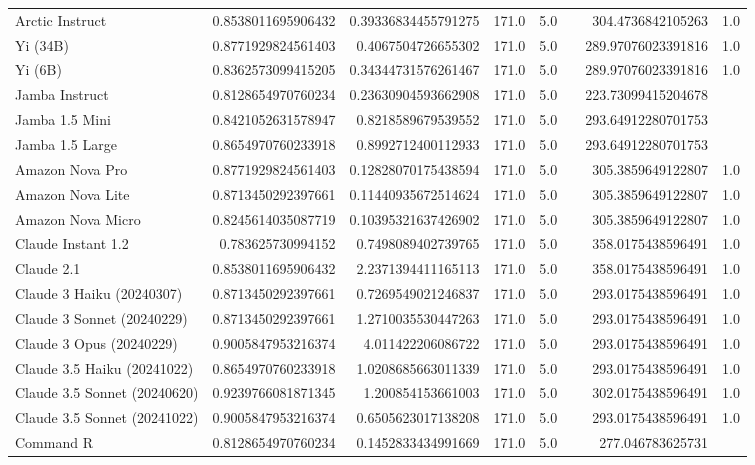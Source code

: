 \begin{table}[htp]
{\begin{tabular}{lrrrrrrr}
Arctic Instruct & 0.8538011695906432 & 0.39336834455791275 & 171.0 & 5.0 &  & 304.4736842105263 & 1.0 \\
Yi (34B) & 0.8771929824561403 & 0.4067504726655302 & 171.0 & 5.0 &  & 289.97076023391816 & 1.0 \\
Yi (6B) & 0.8362573099415205 & 0.34344731576261467 & 171.0 & 5.0 &  & 289.97076023391816 & 1.0 \\
Jamba Instruct & 0.8128654970760234 & 0.23630904593662908 & 171.0 & 5.0 &  & 223.73099415204678 &  \\
Jamba 1.5 Mini & 0.8421052631578947 & 0.8218589679539552 & 171.0 & 5.0 &  & 293.64912280701753 &  \\
Jamba 1.5 Large & 0.8654970760233918 & 0.8992712400112933 & 171.0 & 5.0 &  & 293.64912280701753 &  \\
Amazon Nova Pro & 0.8771929824561403 & 0.12828070175438594 & 171.0 & 5.0 &  & 305.3859649122807 & 1.0 \\
Amazon Nova Lite & 0.8713450292397661 & 0.11440935672514624 & 171.0 & 5.0 &  & 305.3859649122807 & 1.0 \\
Amazon Nova Micro & 0.8245614035087719 & 0.10395321637426902 & 171.0 & 5.0 &  & 305.3859649122807 & 1.0 \\
Claude Instant 1.2 & 0.783625730994152 & 0.7498089402739765 & 171.0 & 5.0 &  & 358.0175438596491 & 1.0 \\
Claude 2.1 & 0.8538011695906432 & 2.2371394411165113 & 171.0 & 5.0 &  & 358.0175438596491 & 1.0 \\
Claude 3 Haiku (20240307) & 0.8713450292397661 & 0.7269549021246837 & 171.0 & 5.0 &  & 293.0175438596491 & 1.0 \\
Claude 3 Sonnet (20240229) & 0.8713450292397661 & 1.2710035530447263 & 171.0 & 5.0 &  & 293.0175438596491 & 1.0 \\
Claude 3 Opus (20240229) & 0.9005847953216374 & 4.011422206086722 & 171.0 & 5.0 &  & 293.0175438596491 & 1.0 \\
Claude 3.5 Haiku (20241022) & 0.8654970760233918 & 1.0208685663011339 & 171.0 & 5.0 &  & 293.0175438596491 & 1.0 \\
Claude 3.5 Sonnet (20240620) & 0.9239766081871345 & 1.200854153661003 & 171.0 & 5.0 &  & 302.0175438596491 & 1.0 \\
Claude 3.5 Sonnet (20241022) & 0.9005847953216374 & 0.6505623017138208 & 171.0 & 5.0 &  & 293.0175438596491 & 1.0 \\
Command R & 0.8128654970760234 & 0.1452833434991669 & 171.0 & 5.0 &  & 277.046783625731 &  \\

\end{tabular}}
\end{table}
